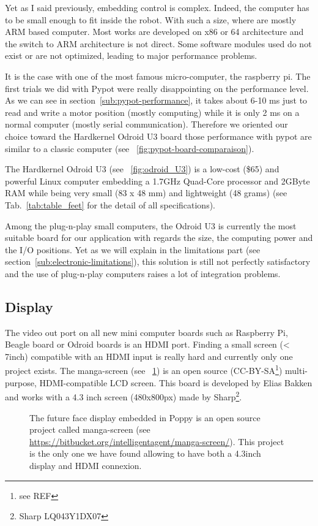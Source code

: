 Yet as I said previously, embedding control is complex. Indeed, the computer has to be small enough to fit inside the robot. With such a size, where are mostly ARM based computer. Most works are developed on x86 or 64 architecture and the switch to ARM architecture is not direct. Some software modules used do not exist or are not optimized, leading to major performance problems.

It is the case with one of the most famous micro-computer, the raspberry pi. The first trials we did with Pypot were really disappointing on the performance level. As we can see in section~\ref{sub:pypot-performance}, it takes about 6-10 ms just to read and write a motor position (mostly computing) while it is only 2 ms on a normal computer (mostly serial communication). Therefore we oriented our choice toward the Hardkernel Odroid U3 board those performance with pypot are similar to a classic computer (see \figurename~\ref{fig:pypot-board-comparaison}).


The Hardkernel Odroid U3 (see \figurename~\ref{fig:odroid_U3}) is a low-cost (\$65) and powerful Linux computer embedding a 1.7GHz Quad-Core processor and 2GByte RAM while being very small (83 x 48 mm) and lightweight (48 grams) (see Tab.~\ref{tab:table_feet} for the detail of all specifications).


Among the plug-n-play small computers, the Odroid U3 is currently the most suitable board for our application with regards the size, the computing power and the I/O positions.
Yet as we will explain in the limitations part (see section~\ref{sub:electronic-limitations}), this solution is still not perfectly satisfactory and the use of plug-n-play computers raises a lot of integration problems.

\subsection{Display} %

The video out port on all new mini computer boards such as Raspberry Pi, Beagle board or Odroid boards is an HDMI port. Finding a small screen (< 7inch) compatible with an HDMI input is really hard and currently only one project exists. The manga-screen (see \figurename~\ref{fig:manga-screen}) is an open source (CC-BY-SA\footnote{see REF}) multi-purpose, HDMI-compatible LCD screen. This board is developed by Elias Bakken and works with a 4.3 inch screen (480x800px) made by Sharp\footnote{Sharp LQ043Y1DX07}.

\begin{figure}[ht]
\centering
    \hfil
    \caption{The future face display embedded in Poppy is an open source project called manga-screen (see \url{https://bitbucket.org/intelligentagent/manga-screen/}). This project is the only one we have found allowing to have both a 4.3inch display and HDMI connexion.}
    \label{fig:manga-screen}
\end{figure}

